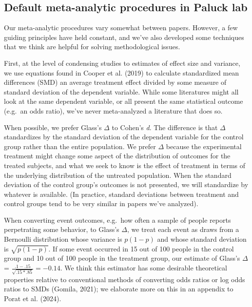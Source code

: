 \documentclass[
  ,jou]{apa6}
\begin{document}
\subsection{Default meta-analytic procedures in Paluck lab}\label{default-meta-analytic-procedures-in-paluck-lab}

Our meta-analytic procedures vary somewhat between papers. However, a few guiding principles have held constant, and we've also developed some techniques that we think are helpful for solving methodological issues.

First, at the level of condensing studies to estimates of effect size and variance, we use equations found in Cooper et al. (2019) to calculate standardized mean differences (SMD) \textemdash an average treatment effect divided by some measure of standard deviation of the dependent variable. While some literatures might all look at the same dependent variable, or all present the same statistical outcome (e.g.~an odds ratio), we've never meta-analyzed a literature that does so.

When possible, we prefer Glass's \(\Delta\) to Cohen's \emph{d}. The difference is that \(\Delta\) standardizes by the standard deviation of the dependent variable for the control group rather than the entire population. We prefer \(\Delta\) because the experimental treatment might change some aspect of the distribution of outcomes for the treated subjects, and what we seek to know is the effect of treatment in terms of the underlying distribution of the untreated population. When the standard deviation of the control group's outcomes is not presented, we will standardize by whatever is available. (In practice, standard deviations between treatment and control groups tend to be very similar in papers we've analyzed).

When converting event outcomes, e.g.~how often a sample of people reports perpetrating some behavior, to Glass's \(\Delta\), we treat each event as draws from a Bernoulli distribution whose variance is \(p (1-p)\) and whose standard deviation is \(\sqrt{p(1-p)}\). If some event occurred in 15 out of 100 people in the control group and 10 out of 100 people in the treatment group, our estimate of Glass's \(\Delta\) = \(\frac{.1 - .15}{\sqrt{.15 * .85}} = -0.14\). We think this estimator has some desirable theoretical properties relative to conventional methods of converting odds ratios or log odds ratios to SMDs (Gomila, 2021); we elaborate more on this in an appendix to Porat et al. (2024).
\end{document}
